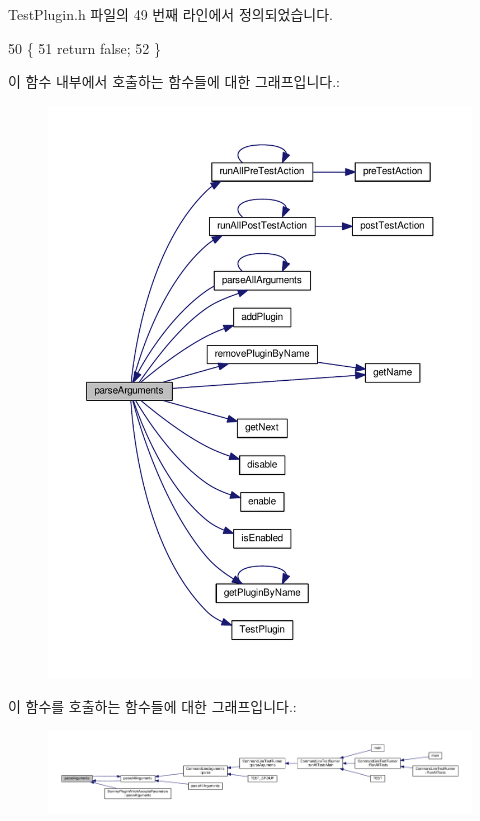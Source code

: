 Test\+Plugin.\+h 파일의 49 번째 라인에서 정의되었습니다.


\begin{DoxyCode}
50     \{
51         \textcolor{keywordflow}{return} \textcolor{keyword}{false};
52     \}
\end{DoxyCode}


이 함수 내부에서 호출하는 함수들에 대한 그래프입니다.\+:
\nopagebreak
\begin{figure}[H]
\begin{center}
\leavevmode
\includegraphics[width=350pt]{class_test_plugin_a167c2b07a0f83726bb9b1d1c0d741f88_cgraph}
\end{center}
\end{figure}




이 함수를 호출하는 함수들에 대한 그래프입니다.\+:
\nopagebreak
\begin{figure}[H]
\begin{center}
\leavevmode
\includegraphics[width=350pt]{class_test_plugin_a167c2b07a0f83726bb9b1d1c0d741f88_icgraph}
\end{center}
\end{figure}


